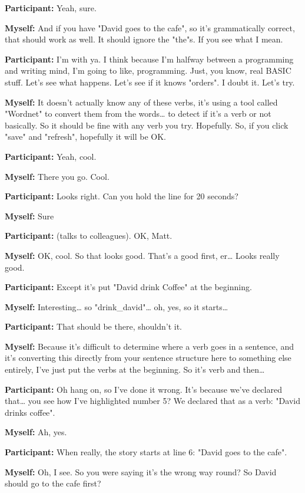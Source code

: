 \documentclass[11pt]{report}
\begin{document}
\begin{linenumbers}
\textbf{Participant:} Yeah, sure.

\textbf{Myself:} And if you have "David goes to the cafe", so it's grammatically correct, that should work as well. It should ignore the "the"s. If you see what I mean.

\textbf{Participant:} I'm with ya. I think because I'm halfway between a programming and writing mind, I'm going to like, programming. Just, you know, real BASIC stuff. Let's see what happens. Let's see if it knows "orders". I doubt it. Let's try.

\textbf{Myself:} It doesn't actually know any of these verbs, it's using a tool called "Wordnet" to convert them from the words\ldots{} to detect if it's a verb or not basically. So it should be fine with any verb you try. Hopefully. So, if you click "save" and "refresh", hopefully it will be OK.

\textbf{Participant:} Yeah, cool.

\textbf{Myself:} There you go. Cool.

\textbf{Participant:} Looks right. Can you hold the line for 20 seconds? 

\textbf{Myself:} Sure

\textbf{Participant:} (talks to colleagues). OK, Matt.

\textbf{Myself:} OK, cool. So that looks good. That's a good first, er\ldots{} Looks really good.

\textbf{Participant:} Except it's put "David drink Coffee" at the beginning.

\textbf{Myself:} Interesting\ldots{} so "drink_david"\ldots{} oh, yes, so it starts\ldots{}

\textbf{Participant:} That should be there, shouldn't it.

\textbf{Myself:} Because it's difficult to determine where a verb goes in a sentence, and it's converting this directly from your sentence structure here to something else entirely, I've just put the verbs at the beginning. So it's verb and then\ldots{}

\textbf{Participant:} Oh hang on, so I've done it wrong. It's because we've declared that\ldots{} you see how I've highlighted number 5? We declared that as a verb: "David drinks coffee".

\textbf{Myself:} Ah, yes.

\textbf{Participant:} When really, the story starts at line 6: "David goes to the cafe".

\textbf{Myself:} Oh, I see. So you were saying it's the wrong way round? So David should go to the cafe first?


\end{linenumbers}
\end{document}
